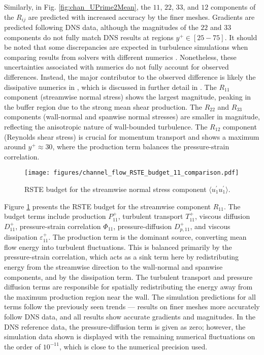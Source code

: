 Similarly, in Fig. \ref{fig:chan_UPrime2Mean}, the $11$, $22$, $33$, and $12$ components of the $R_{ij}$ are predicted with increased accuracy by the finer meshes. Gradients are predicted following DNS data, although the magnitudes of the $22$ and $33$ components do not fully match DNS results at regions $y^{+}\in \left[ 25-75 \right]$. It should be noted that some discrepancies are expected in turbulence simulations when comparing results from solvers with different numerics \cite{chen2023quantifying}.
Nonetheless, these uncertainties associated with numerics do not fully account for observed differences.
Instead, the major contributor to the observed difference is likely the dissipative numerics in \OF, which is discussed in further detail in \cite{montecchia2019improving}.
The $R_{11}$ component (streamwise normal stress) shows the largest magnitude, peaking in the buffer region due to the strong mean shear production. The $R_{22}$ and $R_{33}$ components (wall-normal and spanwise normal stresses) are smaller in magnitude, reflecting the anisotropic nature of wall-bounded turbulence. The $R_{12}$ component (Reynolds shear stress) is crucial for momentum transport and shows a maximum around $y^{+} \approx 30$, where the production term balances the pressure-strain correlation.

\begin{figure}[ht]
    \centering
    \texttt{[image: figures/channel\_flow\_RSTE\_budget\_11\_comparison.pdf]}
    \caption{RSTE budget for the streamwise normal stress component $\langle u^{\prime}_1 u^{\prime}_1\rangle$.}
    \label{fig:chan_uu_RSTE}
\end{figure}

Figure \ref{fig:chan_uu_RSTE} presents the RSTE budget for the streamwise component $R_{11}$. The budget terms include production $P^+_{11}$, turbulent transport $T^+_{11}$, viscous diffusion $D^+_{11}$, pressure-strain correlation $\Phi_{11}$, pressure-diffusion $D^{+}_{p, 11}$, and viscous dissipation $\varepsilon^+_{11}$. The production term is the dominant source, converting mean flow energy into turbulent fluctuations. This is balanced primarily by the pressure-strain correlation, which acts as a sink term here by redistributing energy from the streamwise direction to the wall-normal and spanwise components, and by the dissipation term. The turbulent transport and pressure diffusion terms are responsible for spatially redistributing the energy away from the maximum production region near the wall. The simulation predictions for all terms follow the previously seen trends --- results on finer meshes more accurately follow DNS data, and all results show accurate gradients and magnitudes. In the DNS reference data, the pressure-diffusion term is given as zero; however, the simulation data shown is displayed with the remaining numerical fluctuations on the order of $10^{-11}$, which is close to the numerical precision used.

